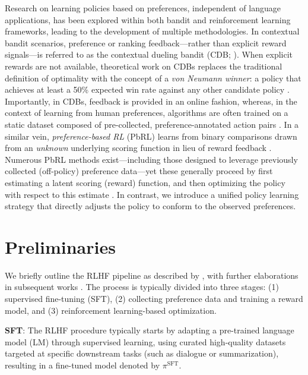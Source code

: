 Research on learning policies based on preferences, independent of language applications, has been explored within both bandit and reinforcement learning frameworks, leading to the development of multiple methodologies. In contextual bandit scenarios, preference or ranking feedback—rather than explicit reward signals—is referred to as the contextual dueling bandit (CDB; \cite{yue2012karmed,dudik2015contextual}). When explicit rewards are not available, theoretical work on CDBs replaces the traditional definition of optimality with the concept of a \textit{von Neumann winner}: a policy that achieves at least a 50\% expected win rate against any other candidate policy \citep{dudik2015contextual}. Importantly, in CDBs, feedback is provided in an online fashion, whereas, in the context of learning from human preferences, algorithms are often trained on a static dataset composed of pre-collected, preference-annotated action pairs \citep{yan2022human}. In a similar vein, \textit{preference-based RL} (PbRL) learns from binary comparisons drawn from an \textit{unknown} underlying scoring function in lieu of reward feedback \citep{BusaFekete2014,ruiz2023dueling}. Numerous PbRL methods exist—including those designed to leverage previously collected (off-policy) preference data—yet these generally proceed by first estimating a latent scoring (reward) function, and then optimizing the policy with respect to this estimate \citep{jain2013learning,BusaFekete2014,christiano2017deep,sadigh2017active,kupcsik2018learning}. In contrast, we introduce a unified policy learning strategy that directly adjusts the policy to conform to the observed preferences.

\section{Preliminaries}\label{section:prelims}

We briefly outline the RLHF pipeline as described by \citeauthor{ziegler2020finetuning}, with further elaborations in subsequent works \citep{stiennon2022learning, bai2022training, ouyang2022training}. The process is typically divided into three stages: (1) supervised fine-tuning (SFT), (2) collecting preference data and training a reward model, and (3) reinforcement learning-based optimization.

\textbf{SFT}: The RLHF procedure typically starts by adapting a pre-trained language model (LM) through supervised learning, using curated high-quality datasets targeted at specific downstream tasks (such as dialogue or summarization), resulting in a fine-tuned model denoted by $\pi^\text{SFT}$.

